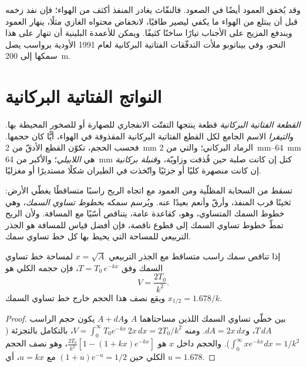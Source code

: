 وقد يُخفق العمود أيضًا في الصعود. فالنفّاث يغادر المنفذ أكثف من الهواء؛ فإن
نفد زخمه قبل أن يبتلع من الهواء ما يكفي ليصير طافيًا،
لانخفاض محتواه الغازي مثلًا، ينهار العمود ويندفع المزيج
على الأجناب تيارًا ساخنًا كثيفًا. ويمكن للأعمدة البلينية أن تنهار على
هذا النحو، وفي بيناتوبو ملأت التدفّقات الفتاتية البركانية لعام 1991 الأودية
برواسب يصل سمكها إلى \qty{200}{m}.

\section{النواتج الفتاتية البركانية}

\begin{definition}\label{def:b2:eruptive-styles:tephra}
\emph{القطعة الفتاتية البركانية} قطعة ينتجها التفتّت
الانفجاري للصهارة أو للصخور المحيطة بها. و\emph{التيفرا}
الاسم الجامع لكل القطع الفتاتية البركانية المقذوفة في الهواء، أيًّا كان حجمها.
فحسب الحجم، تكوّن القطع الأدقّ من \qty{2}{mm} الرماد البركاني؛ والتي
من \qtyrange{2}{64}{mm} هي \emph{اللابيلي}؛ والأكبر من
\qty{64}{mm} كتل إن كانت صلبة حين قُذفت وزاويّة،
و\emph{قنبلة بركانية} إن كانت منصهرة كليًا أو جزئيًا
واتّخذت في الطيران شكلًا مستديرًا أو مغزليًا.
\end{definition}

تسقط  من السحابة المظلّية ومن العمود مع اتجاه الريح راسبًا متساقطًا
يغطّي الأرض: ثخينًا قرب المنفذ، وأرقّ وأنعم بعيدًا عنه. ويُرسم
سمكه ب\emph{خطوط تساوي السمك}، وهي خطوط السمك المتساوي، وهو، كقاعدة عامة،
يتناقص أسّيًا مع المسافة. ولأن الريح تمطّ خطوط تساوي السمك
إلى قطوع ناقصة، فإن أفضل قياس للمسافة هو الجذر التربيعي للمساحة التي يحيط بها
كل خط تساوي سمك.

\begin{proposition}\label{prop:b2:eruptive-styles:thinning}
إذا تناقص سمك راسب متساقط مع الجذر التربيعي $x = \sqrt A$
لمساحة خط تساوي السمك وفق $T = T_0\,e^{-kx}$، فإن حجمه الكلي هو
\[
V = \frac{2T_0}{k^2}.
\]
ويقع نصف هذا الحجم خارج خط تساوي السمك $x_{1/2} = 1.678/k$.
\end{proposition}

\begin{proof}
بين خطّي تساوي السمك اللذين مساحتاهما $A$ و$A + dA$ يكون حجم الراسب $T\,dA$،
و$dA = 2x\,dx$. ومنه $V = \int_0^\infty T_0e^{-kx}\,2x\,dx = 2T_0/k^2$،
بالتكامل بالتجزئة ($\int_0^\infty xe^{-kx}dx = 1/k^2$). والحجم داخل $x$
هو $\frac{2T_0}{k^2}[1 - (1 + kx)e^{-kx}]$، وهو نصف الحجم الكلي حين $(1 +
u)e^{-u} = 1/2$ مع $u = kx$، أي $u = 1.678$.
\end{proof}

